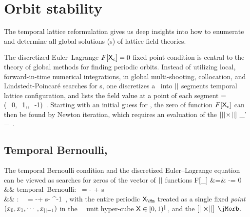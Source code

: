
\section{Orbit stability}
\label{s:JacobianOrb}

The {temporal lattice} reformulation gives us deep insights into how to
enumerate and determine all global solutions ({\lattstate}s) of
lattice field theories.

The discretized Euler–\-Lagrange
$F[\mathsf{X}_c]=0$ fixed point condition  is central to the
theory of {global methods} for finding periodic orbits. Instead of
utilizing local, for\-ward-in-time numerical integrations, in
global multi-shooting,
collocation, and Lindstedt-Poincar{\'e}
searches for \po s, one discretizes a \po\ into ${||}$
segments temporal lattice
configuration,
and lists the field value at a point of each segment
\beq
\transp{\Xx}=(\ssp_0,\ssp_{1},\cdots,\ssp_{\cl{}-1})
\,.
Starting with an initial guess for \Xx, the zero of function
$F[\mathsf{X}_c]$ can then be found by Newton iteration, which requires
an evaluation of the $[{||}\!\times\!{||}]$ \emph{\jacobianOrb}
\beq
\jMorb_{\zeit\zeit'} =
\,.

\subsection{Temporal Bernoulli, {\templatt}} %
\label{s:JacobianOrbBern}

The {temporal Bernoulli} condition
 and
the
{\templatt} discretized Euler–\-Lagrange equation 
can be viewed as searches for zeros of the vector of
${||}$ functions
\bea
F[\Xx_\Mm] &=& \jMorb\Xx-\Mm = 0
                \label{tempFixPoint}\\
&& \mbox{temporal Bernoulli: } \qquad \jMorb =  - {\shift} + {s}\id
                \label{bernFixPoint}\\
&& \mbox{\templatt: } \qquad\qquad\;\;\,    \jMorb =  -\shift + s\id - \shift^{-1}
                \label{tempCatFix}
\,,
\eea
with the entire periodic \emph{{\lattstate}} ${\Xx}_{\Mm}$ treated as a
single fixed \emph{point} $(x_0,x_{1},\cdots,x_{{||}-1})$ in the
\cl{}\dmn\ \statesp\ unit hyper-cube $\mathsf{X}\in[0,1)^{||}$, and
the $[{||}\!\times\!{||}]$ {\jacobianOrb}  $\jMorb$.

